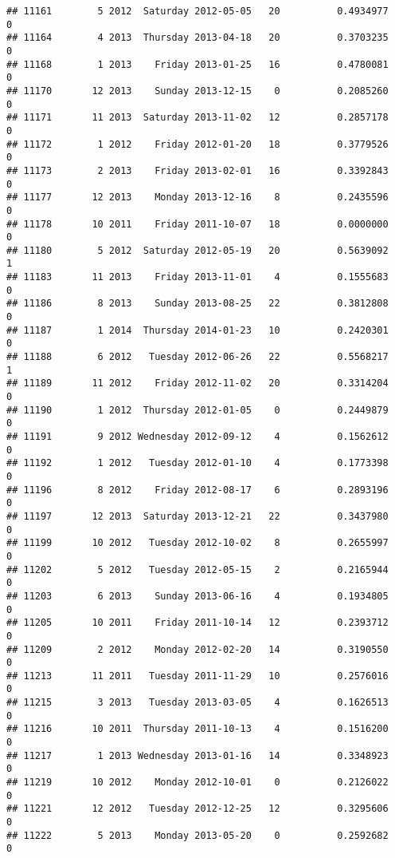 \documentclass[
]{article}
\begin{document}
\begin{verbatim}
## 11161        5 2012  Saturday 2012-05-05   20          0.4934977             0
## 11164        4 2013  Thursday 2013-04-18   20          0.3703235             0
## 11168        1 2013    Friday 2013-01-25   16          0.4780081             0
## 11170       12 2013    Sunday 2013-12-15    0          0.2085260             0
## 11171       11 2013  Saturday 2013-11-02   12          0.2857178             0
## 11172        1 2012    Friday 2012-01-20   18          0.3779526             0
## 11173        2 2013    Friday 2013-02-01   16          0.3392843             0
## 11177       12 2013    Monday 2013-12-16    8          0.2435596             0
## 11178       10 2011    Friday 2011-10-07   18          0.0000000             0
## 11180        5 2012  Saturday 2012-05-19   20          0.5639092             1
## 11183       11 2013    Friday 2013-11-01    4          0.1555683             0
## 11186        8 2013    Sunday 2013-08-25   22          0.3812808             0
## 11187        1 2014  Thursday 2014-01-23   10          0.2420301             0
## 11188        6 2012   Tuesday 2012-06-26   22          0.5568217             1
## 11189       11 2012    Friday 2012-11-02   20          0.3314204             0
## 11190        1 2012  Thursday 2012-01-05    0          0.2449879             0
## 11191        9 2012 Wednesday 2012-09-12    4          0.1562612             0
## 11192        1 2012   Tuesday 2012-01-10    4          0.1773398             0
## 11196        8 2012    Friday 2012-08-17    6          0.2893196             0
## 11197       12 2013  Saturday 2013-12-21   22          0.3437980             0
## 11199       10 2012   Tuesday 2012-10-02    8          0.2655997             0
## 11202        5 2012   Tuesday 2012-05-15    2          0.2165944             0
## 11203        6 2013    Sunday 2013-06-16    4          0.1934805             0
## 11205       10 2011    Friday 2011-10-14   12          0.2393712             0
## 11209        2 2012    Monday 2012-02-20   14          0.3190550             0
## 11213       11 2011   Tuesday 2011-11-29   10          0.2576016             0
## 11215        3 2013   Tuesday 2013-03-05    4          0.1626513             0
## 11216       10 2011  Thursday 2011-10-13    4          0.1516200             0
## 11217        1 2013 Wednesday 2013-01-16   14          0.3348923             0
## 11219       10 2012    Monday 2012-10-01    0          0.2126022             0
## 11221       12 2012   Tuesday 2012-12-25   12          0.3295606             0
## 11222        5 2013    Monday 2013-05-20    0          0.2592682             0

\end{verbatim}
\end{document}
